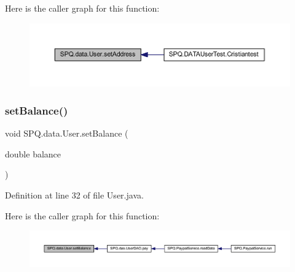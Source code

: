 Here is the caller graph for this function\+:
\nopagebreak
\begin{figure}[H]
\begin{center}
\leavevmode
\includegraphics[width=350pt]{class_s_p_q_1_1data_1_1_user_ab6e40ae379cda1d98a5873365df30736_icgraph}
\end{center}
\end{figure}
\mbox{\label{class_s_p_q_1_1data_1_1_user_ab9b205d96fa6c53cc3956c2ddcc9c4a7}} 
\subsubsection{\texorpdfstring{set\+Balance()}{setBalance()}}
{\footnotesize\ttfamily void S\+P\+Q.\+data.\+User.\+set\+Balance (\begin{DoxyParamCaption}\item[{double}]{balance }\end{DoxyParamCaption})}



Definition at line 32 of file User.\+java.

Here is the caller graph for this function\+:
\nopagebreak
\begin{figure}[H]
\begin{center}
\leavevmode
\includegraphics[width=350pt]{class_s_p_q_1_1data_1_1_user_ab9b205d96fa6c53cc3956c2ddcc9c4a7_icgraph}
\end{center}
\end{figure}
\mbox{\label{class_s_p_q_1_1data_1_1_user_a0fe49415c82bbbbfa0b22822f054157f}} 
